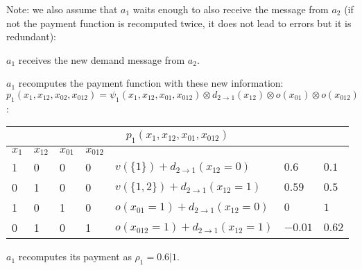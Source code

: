 \documentclass{article}
\begin{document}
\noindent Note: we also assume that $a_1$ waits enough to also receive the
message from $a_2$ (if not the payment function is recomputed twice, it does not lead to
errors but it is redundant):

\noindent $a_1$ receives the new demand message from $a_2$.

 \noindent $a_1$ recomputes the payment function
with these new information: $p_1(x_{1},x_{12},x_{02},x_{012}) =
\psi_1(x_{1},x_{12},x_{01},x_{012}) \otimes d_{2\rightarrow 1}(x_{12}) \otimes
o(x_{01}) \otimes  o(x_{012})$:

\noindent\begin{tabular}{ | l | l |  l | l | l | l |l | }
\multicolumn{7}{c}{$p_1(x_{1},x_{12},x_{01},x_{012})$}  \\
\hline
	$x_{1}$ &	$x_{12}$ & $x_{01}$ & $x_{012}$ &   & & \\
\hline
	1	 &		0	 &  0	&  0 &  $v(\{1\}) + d_{2\rightarrow 1}(x_{12}=0)
	$ & $0.6$ & $0.1$\\
	0	 &		1	 &	0 	&  0 & $v(\{1,2\})+ d_{2\rightarrow 1}(x_{12}=1)$&
	$0.59$& $0.5$\\ 
	1	 &		0	 &  1	&  0 & $o(x_{01}=1)+ d_{2\rightarrow 1}(x_{12}=0)$ & $0$ &
	$1$\\ 
	0	 &		1	 &	0 	&  1 &  $o(x_{012}=1)+ d_{2\rightarrow 1}(x_{12}=1)$
	&$-0.01$ &$0.62$\\
\hline
\end{tabular}


\vspace{0.1in}\noindent $a_1$ recomputes its payment as $\rho_1= 0.6 \vert
1$.
\end{document}
